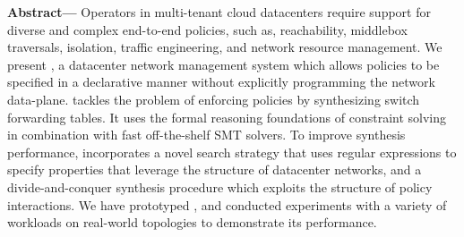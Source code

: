 
  {\bf Abstract---} Operators in multi-tenant cloud datacenters
  require support for diverse and complex end-to-end policies, such as,
  reachability, middlebox traversals, isolation, traffic engineering,
  and network resource management. We present \Name, a datacenter
  network management system which allows policies to be specified in a
  declarative manner without explicitly programming the network
  data-plane.  \name tackles the problem of enforcing policies by
  synthesizing switch forwarding tables. It uses the
  formal reasoning foundations of constraint solving in combination
  with fast off-the-shelf SMT solvers.  To improve synthesis
  performance, \Name incorporates a novel search strategy that uses
  regular expressions to specify properties that leverage the
  structure of datacenter networks,
  and a divide-and-conquer synthesis procedure which exploits the
  structure of policy interactions.  We have prototyped \Name, and conducted
  experiments with a variety of workloads on real-world topologies
  to demonstrate its  performance.

